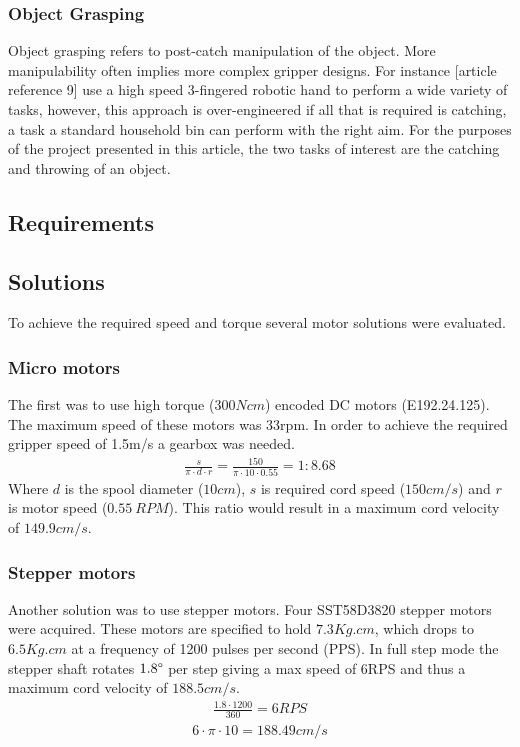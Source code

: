 \documentclass[conference]{IEEEtran}
\begin{document}
\subsubsection{Object Grasping}
Object grasping refers to post-catch manipulation of the object. More manipulability often implies more complex gripper designs. For instance [article reference 9] use a high speed 3-fingered robotic hand to perform a wide variety of tasks, however, this approach is over-engineered if all that is required is catching, a task a standard household bin can perform with the right aim.
For the purposes of the project presented in this article, the two tasks of interest are the catching and throwing of an object.


\subsection{Requirements}

\subsection{Solutions}
To achieve the required speed and torque several motor solutions were evaluated. 
\subsubsection{Micro motors}\label{gearbox_sol}
The first was to use high torque ($300Ncm$) encoded DC motors (E192.24.125). The maximum speed of these motors was 33rpm. In order to achieve the required gripper speed of 1.5m/s a gearbox was needed.
\begin{equation}
\begin{aligned}
\frac{s}{\pi\cdot d \cdot r} = \frac{150}{\pi\cdot 10 \cdot 0.55} = 1:8.68
\end{aligned}
\end{equation}
Where $d$ is the spool diameter ($10cm$), $s$ is required cord speed ($150cm/s$) and $r$ is motor speed ($0.55 \ RPM$). This ratio would result in a maximum cord velocity of $149.9 cm/s$.\\ 
\subsubsection{Stepper motors}
Another solution was to use stepper motors. Four SST58D3820 stepper motors were acquired. These motors are specified to hold $7.3Kg.cm$, which drops to $6.5Kg.cm$ at a frequency of 1200 pulses per second (PPS). In full step mode the stepper shaft rotates $1.8\degree$ per step giving a max speed of 6RPS and thus a maximum cord velocity of $188.5cm/s$. \begin{equation}
\begin{aligned}
\frac{1.8\cdot 1200}{360} = 6 RPS
\end{aligned}
\end{equation}
\begin{equation}
\begin{aligned}
6\cdot\pi\cdot 10 = 188.49cm/s
\end{aligned}
\end{equation}
\end{document}
